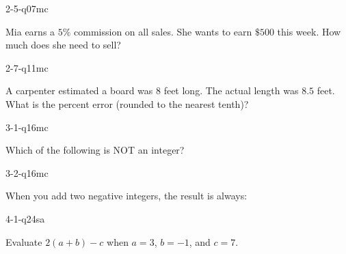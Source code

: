 \documentclass[12pt, fleqn, openany]{studyGuide}
\begin{document}
\begin{practiceQuestion}{2-5-q07}{mc}
\begin{questionText}
Mia earns a $5\%$ commission on all sales. She wants to earn $\$500$ this week. How much does she need to sell?
\end{questionText}
\end{practiceQuestion}

\begin{practiceQuestion}{2-7-q11}{mc}
\begin{questionText}
A carpenter estimated a board was $8$ feet long. The actual length was $8.5$ feet. What is the percent error (rounded to the nearest tenth)?
\end{questionText}
\end{practiceQuestion}

\begin{practiceQuestion}{3-1-q16}{mc}
\begin{questionText}
Which of the following is NOT an integer?
\end{questionText}
\end{practiceQuestion}

\begin{practiceQuestion}{3-2-q16}{mc}
\begin{questionText}
When you add two negative integers, the result is always:
\end{questionText}
\end{practiceQuestion}

\begin{practiceQuestion}{4-1-q24}{sa}
\begin{questionText}
Evaluate $2(a + b) - c$ when $a = 3$, $b = -1$, and $c = 7$.
\end{questionText}
\end{practiceQuestion}
\end{document}
